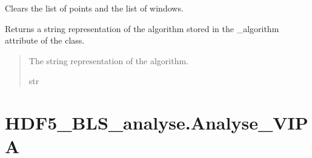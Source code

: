 \documentclass[letterpaper,10pt,english]{sphinxmanual}
\begin{document}
\begin{fulllineitems}
\begin{fulllineitems}
\label{\detokenize{source/_autosummary/HDF5_BLS_analyse.Analyse_general:HDF5_BLS_analyse.Analyse_general.silent_clear_points}}
\pysigstartsignatures
\pysiglinewithargsret
{}
{}
{}
\pysigstopsignatures
\sphinxAtStartPar
Clears the list of points and the list of windows.

\end{fulllineitems}


\begin{fulllineitems}
\label{\detokenize{source/_autosummary/HDF5_BLS_analyse.Analyse_general:HDF5_BLS_analyse.Analyse_general.silent_return_string_algorithm}}
\pysigstartsignatures
\pysiglinewithargsret
{}
{}
{}
\pysigstopsignatures
\sphinxAtStartPar
Returns a string representation of the algorithm stored in the \_algorithm attribute of the class.
\begin{quote}\begin{description}
\sphinxAtStartPar
The string representation of the algorithm.

\sphinxAtStartPar
str

\end{description}\end{quote}

\end{fulllineitems}


\end{fulllineitems}


\sphinxstepscope


\section{HDF5\_BLS\_analyse.Analyse\_VIPA}
\label{\detokenize{source/_autosummary/HDF5_BLS_analyse.Analyse_VIPA:hdf5-bls-analyse-analyse-vipa}}\label{\detokenize{source/_autosummary/HDF5_BLS_analyse.Analyse_VIPA::doc}}
\end{document}
